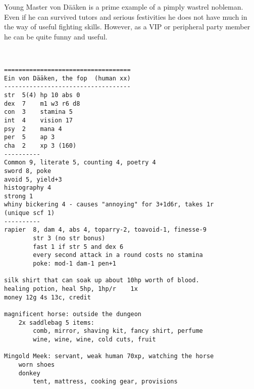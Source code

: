 \clearpage
\begin{samepage}

\noindent Young Master von Dääken is a prime example of a pimply wastrel nobleman. Even if he can survived tutors and serious festivities he does not have much in the way of useful fighting skills. However, as a VIP or peripheral party member he can be quite funny and useful.

\

\small \begin{verbatim}
===================================
Ein von Dääken, the fop  (human xx)
-----------------------------------
str  5(4) hp 10 abs 0
dex  7    m1 w3 r6 d8
con  3    stamina 5
int  4    vision 17
psy  2    mana 4
per  5    ap 3
cha  2    xp 3 (160)
----------
Common 9, literate 5, counting 4, poetry 4
sword 8, poke
avoid 5, yield+3
histography 4
strong 1
whiny bickering 4 - causes "annoying" for 3+1d6r, takes 1r        (unique scf 1)
----------
rapier  8, dam 4, abs 4, toparry-2, toavoid-1, finesse-9
        str 3 (no str bonus)
        fast 1 if str 5 and dex 6
        every second attack in a round costs no stamina
        poke: mod-1 dam-1 pen+1

silk shirt that can soak up about 10hp worth of blood.
healing potion, heal 5hp, 1hp/r    1x
money 12g 4s 13c, credit

magnificent horse: outside the dungeon
    2x saddlebag 5 items:
        comb, mirror, shaving kit, fancy shirt, perfume
        wine, wine, wine, cold cuts, fruit

Mingold Meek: servant, weak human 70xp, watching the horse
    worn shoes
    donkey
        tent, mattress, cooking gear, provisions
\end{verbatim} \end{samepage} \normalsize






